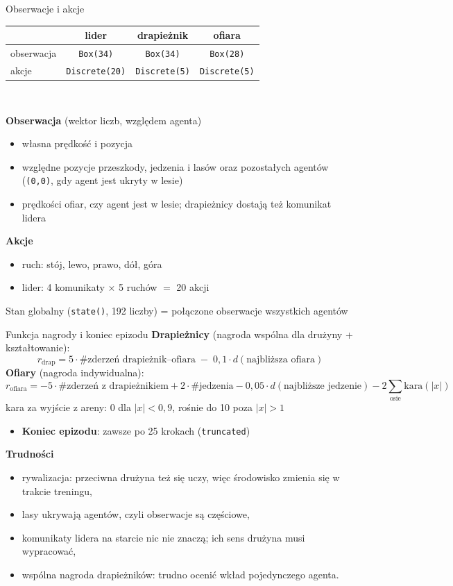 \documentclass[aspectratio=169,10pt]{beamer}
\newcommand{\code}[1]{\texttt{#1}}
\begin{document}
\begin{frame}{Obserwacje i akcje}
  \small
  \centering
  \begin{tabular}{@{}lccc@{}}
    \toprule
    & lider & drapieżnik & ofiara \\
    \midrule
    obserwacja & \code{Box(34)} & \code{Box(34)} & \code{Box(28)} \\
    akcje & \code{Discrete(20)} & \code{Discrete(5)} & \code{Discrete(5)} \\
    \bottomrule
  \end{tabular}\\[8pt]
  \raggedright
  \textbf{Obserwacja} (wektor liczb, względem agenta)
  \begin{itemize}
    \item własna prędkość i pozycja
    \item względne pozycje przeszkody, jedzenia i lasów oraz pozostałych agentów
      (\code{(0,0)}, gdy agent jest ukryty w lesie)
    \item prędkości ofiar, czy agent jest w lesie; drapieżnicy dostają też komunikat lidera
  \end{itemize}
  \textbf{Akcje}
  \begin{itemize}
    \item ruch: stój, lewo, prawo, dół, góra
    \item lider: 4 komunikaty $\times$ 5 ruchów $=$ 20 akcji
  \end{itemize}
  Stan globalny (\code{state()}, 192 liczby) = połączone obserwacje wszystkich agentów
\end{frame}

\begin{frame}{Funkcja nagrody i koniec epizodu}
  \small
  \textbf{Drapieżnicy} (nagroda wspólna dla drużyny + kształtowanie):
  \[
    r_{\text{drap}} = 5 \cdot \#\text{zderzeń drapieżnik--ofiara} \;-\; 0{,}1 \cdot d(\text{najbliższa ofiara})
  \]
  \textbf{Ofiary} (nagroda indywidualna):
  \[
    r_{\text{ofiara}} = -5 \cdot \#\text{zderzeń z drapieżnikiem} + 2 \cdot \#\text{jedzenia}
    - 0{,}05 \cdot d(\text{najbliższe jedzenie}) - 2 \sum_{\text{osie}} \text{kara}(|x|)
  \]
  kara za wyjście z areny: 0 dla $|x| < 0{,}9$, rośnie do 10 poza $|x| > 1$
  \begin{itemize}
    \item \textbf{Koniec epizodu}: zawsze po 25 krokach (\code{truncated})
  \end{itemize}
  \textbf{Trudności}
  \begin{itemize}
    \item rywalizacja: przeciwna drużyna też się uczy, więc środowisko zmienia się w trakcie treningu,
    \item lasy ukrywają agentów, czyli obserwacje są częściowe,
    \item komunikaty lidera na starcie nic nie znaczą; ich sens drużyna musi wypracować,
    \item wspólna nagroda drapieżników: trudno ocenić wkład pojedynczego agenta.
  \end{itemize}
\end{frame}
\end{document}
